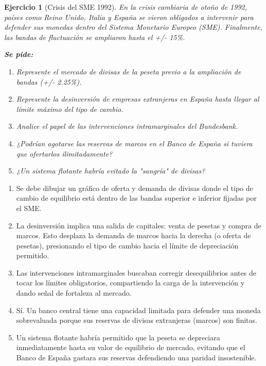 \documentclass[a4paper,12pt]{report}
\theoremstyle{ejerciciostyle}
\newtheorem{ejercicio}{Ejercicio}[chapter]
\begin{document}
\begin{ejercicio}[Crisis del SME 1992]
En la crisis cambiaria de otoño de 1992, países como Reino Unido, Italia y España se vieron obligados a intervenir para defender sus monedas dentro del Sistema Monetario Europeo (SME). Finalmente, las bandas de fluctuación se ampliaron hasta el +/- 15\%.

\textbf{Se pide:}
\begin{enumerate}[label=\Alph*-]
    \item Represente el mercado de divisas de la peseta previo a la ampliación de bandas (+/- 2.25\%).
    \item Represente la desinversión de empresas extranjeras en España hasta llegar al límite máximo del tipo de cambio.
    \item Analice el papel de las intervenciones intramarginales del Bundesbank.
    \item ¿Podrían agotarse las reservas de marcos en el Banco de España si tuviera que ofertarlos ilimitadamente?
    \item ¿Un sistema flotante habría evitado la "sangría" de divisas?
\end{enumerate}
\end{ejercicio}

\begin{solucion}
\begin{enumerate}[label=\Alph*-]
    \item Se debe dibujar un gráfico de oferta y demanda de divisas donde el tipo de cambio de equilibrio está dentro de las bandas superior e inferior fijadas por el SME.
    \item La desinversión implica una salida de capitales: venta de pesetas y compra de marcos. Esto desplaza la demanda de marcos hacia la derecha (o oferta de pesetas), presionando el tipo de cambio hacia el límite de depreciación permitido.
    \item Las intervenciones intramarginales buscaban corregir desequilibrios antes de tocar los límites obligatorios, compartiendo la carga de la intervención y dando señal de fortaleza al mercado.
    \item Sí. Un banco central tiene una capacidad limitada para defender una moneda sobrevaluada porque sus reservas de divisas extranjeras (marcos) son finitas.
    \item Un sistema flotante habría permitido que la peseta se depreciara inmediatamente hasta su valor de equilibrio de mercado, evitando que el Banco de España gastara sus reservas defendiendo una paridad insostenible.
\end{enumerate}
\end{solucion}
\end{document}
